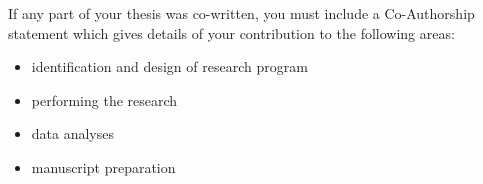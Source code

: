 If any part of your thesis was co-written, you must include a Co-Authorship
statement which gives details of your contribution to the following
areas: 
\begin{itemize}
\item identification and design of research program 
\item performing the research 
\item data analyses 
\item manuscript preparation\end{itemize}

